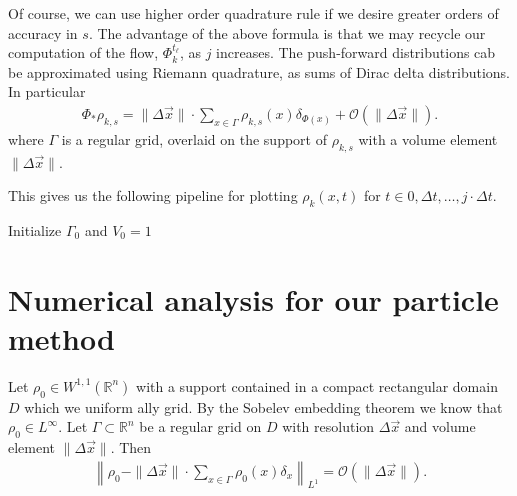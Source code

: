 \documentclass[12pt]{amsart}
\begin{document}
Of course, we can use higher order quadrature rule if we desire greater orders of accuracy in $s$.
The advantage of the above formula is that we may recycle our computation of the flow, $\Phi_k^{t_\ell}$, as $j$ increases.
The push-forward distributions cab be approximated using Riemann quadrature, as sums of Dirac delta distributions.
In particular
\begin{align*}
	\Phi_* \rho_{k,s} = \| \Delta \vec{x} \| \cdot \sum_{x \in \Gamma} \rho_{k,s}( x ) \delta_{ \Phi(x) } + \mathcal{O}( \| \Delta \vec{x} \| ).
\end{align*}
where $\Gamma$ is a regular grid, overlaid on the support of $\rho_{k,s}$ with a volume element $\| \Delta \vec{x} \|$.

This gives us the following pipeline for plotting $\rho_k(x,t)$ for $t \in 0, \Delta t, \dots, j \cdot \Delta t$.
\begin{algorithm}[H]
	Initialize $\Gamma_0$ and $V_0 = 1$ \;
\end{algorithm}


\section{Numerical analysis for our particle method}

Let $\rho_0 \in W^{1,1}( \mathbb{R}^n) $ with a support contained in a compact rectangular domain $D$ which we uniform ally grid.
By the Sobelev embedding theorem we know that $\rho_0 \in L^\infty$.
Let $\Gamma \subset \mathbb{R}^n$ be a regular grid on $D$ with resolution $\Delta \vec{x}$ and volume element $ \| \Delta \vec{x} \|$.
Then
\begin{align*}
	 \left \| \rho_0 - \| \Delta \vec{x} \| \cdot \sum_{x \in \Gamma} \rho_0( x ) \delta_{x} \right \|_{L^1} = \mathcal{O}( \| \Delta \vec{x} \| ).
\end{align*}
\end{document}
